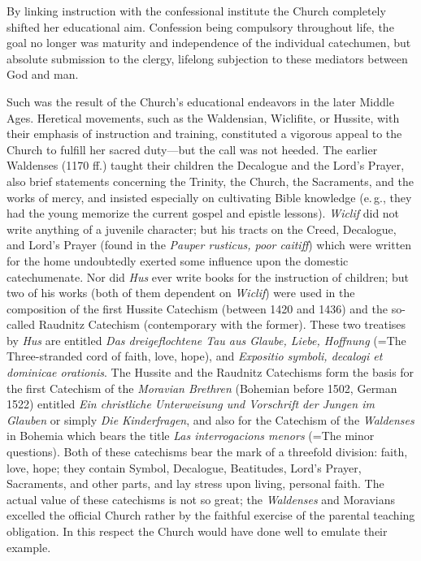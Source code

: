 By linking instruction with the confessional institute the Church completely shifted her educational aim. Confession being compulsory throughout life, the goal no longer was maturity and independence of the individual catechumen, but absolute submission to the clergy, lifelong subjection to these mediators between God and man.

Such was the result of the Church’s educational endeavors in the later Middle Ages. Heretical movements, such as the Waldensian, Wiclifite, or Hussite, with their emphasis of instruction and training, constituted a vigorous appeal to the Church to fulfill her sacred duty—but the call was not heeded. The earlier Waldenses (1170 ff.) taught their children the Decalogue and the Lord’s Prayer, also brief statements concerning the Trinity, the Church, the Sacraments, and the works of mercy, and insisted especially on cultivating Bible
knowledge (e.\,g., they had the young memorize the current gospel and epistle lessons). \emph{Wiclif} did not write anything of a juvenile character; but his tracts on the Creed, Decalogue, and Lord’s Prayer (found in the \emph{Pauper rusticus, poor caitiff}) which were written for the home undoubtedly exerted some influence upon the domestic catechumenate. Nor did \emph{Hus} ever write books for the instruction of children; but two of his works (both of them dependent on \emph{Wiclif}) were used in the composition of the first Hussite Catechism (between 1420 and 1436) and the so-called Raudnitz Catechism (contemporary with the former). These two treatises by \emph{Hus} are entitled \emph{Das dreigeflochtene Tau aus Glaube, Liebe, Hoffnung} (=The Three-stranded cord of faith, love, hope), and \emph{Expositio symboli, decalogi et dominicae orationis}. The Hussite and the Raudnitz Catechisms form the basis for the first Catechism of the \emph{Moravian Brethren} (Bohemian before 1502, German 1522) entitled \emph{Ein christliche Unterweisung und Vorschrift der Jungen im Glauben} or simply \emph{Die Kinderfragen}, and also for the Catechism of the \emph{Waldenses} in Bohemia which bears the title \emph{Las interrogacions menors} (=The minor questions). Both of these catechisms bear the mark of a threefold division: faith, love, hope; they contain Symbol, Decalogue, Beatitudes, Lord’s Prayer, Sacraments, and other parts, and lay stress upon living, personal faith. The actual value of these catechisms is not so great; the \emph{Waldenses} and Moravians excelled the official Church rather by the faithful exercise of the parental teaching obligation. In this respect the Church would have done well to emulate their example.
